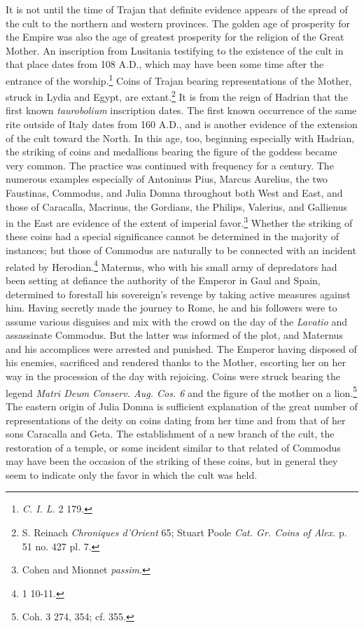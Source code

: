\documentclass[a4paper, 11pt, oneside, polutonikogreek, english]{article}
\begin{document}
It is not until the time of Trajan that definite evidence appears of the spread of the cult to the northern and western provinces. The golden age of prosperity for the Empire was also the age of greatest prosperity for the religion of the Great Mother. An inscription from Lusitania testifying to the existence of the cult in that place dates from 108 \textsc{A.D.}, which may have been some time after the entrance of the worship.\footnote{\emph{C. I. L.} 2 179.} Coins of Trajan bearing representations of the Mother, struck in Lydia and Egypt, are extant.\footnote{S. Reinach \emph{Chroniques d'Orient} 65; Stuart Poole \emph{Cat. Gr. Coins of Alex.} p. 51 no. 427 pl. 7.} It is from the reign of Hadrian that the first known \emph{taurobolium} inscription dates. The first known occurrence of the same rite outside of Italy dates from 160 \textsc{A.D.}, and is another evidence of the extension of the cult toward the North. In this age, too, beginning especially with Hadrian, the striking of coins and medallions bearing the figure of the goddess became very common. The practice was continued with frequency for a century. The numerous examples especially of Antoninus Pius, Marcus Aurelius, the two Faustinas, Commodus, and Julia Domna throughout both West and East, and those of Caracalla, Macrinus, the Gordians, the Philips, Valerius, and Gallienus in the East are evidence of the extent of imperial favor.\footnote{Cohen and Mionnet \emph{passim}.} Whether the striking of these coins had a special significance cannot be determined in the majority of instances; but those of Commodus are naturally to be connected with an incident related by Herodian.\footnote{1 10-11.} Maternus, who with his small army of depredators had been setting at defiance the authority of the Emperor in Gaul and Spain, determined to forestall his sovereign's revenge by taking active measures against him. Having secretly made the journey to Rome, he and his followers were to assume various disguises and mix with the crowd on the day of the \emph{Lavatio} and assassinate Commodus. But the latter was informed of the plot, and Maternus and his accomplices were arrested and punished. The Emperor having disposed of his enemies, sacrificed and rendered thanks to the Mother, escorting her on her way in the procession of the day with rejoicing. Coins were struck bearing the legend \emph{Matri Deum Conserv. Aug. Cos. 6} and the figure of the mother on a lion.\footnote{Coh. 3 274, 354; cf. 355.} The eastern origin of Julia Domna is sufficient explanation of the great number of representations of the deity on coins dating from her time and from that of her sons Caracalla and Geta. The establishment of a new branch of the cult, the restoration of a temple, or some incident similar to that related of Commodus may have been the occasion of the striking of these coins, but in general they seem to indicate only the favor in which the cult was held.
\end{document}
